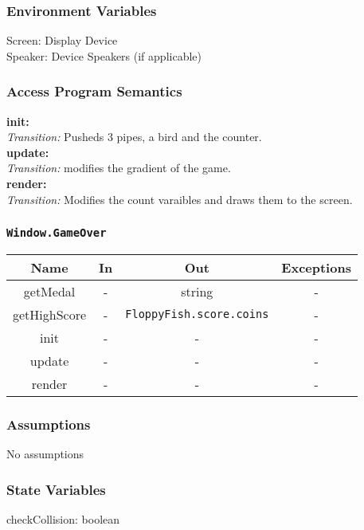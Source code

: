 \documentclass[11pt, oneside]{article}   	%
\begin{document}
\subsubsection*{Environment Variables}
Screen: Display Device\\
Speaker: Device Speakers (if applicable)\\

\subsubsection*{Access Program Semantics} 
 \textbf{init:}  \\
 \textit{Transition:} Pusheds 3 pipes, a bird and the counter.\\
 \textbf{update:}  \\
 \textit{Transition:} modifies the gradient of the game.\\
 \textbf{render:}  \\
 \textit{Transition:} Modifies the count varaibles and draws them to the screen.\\


\subsubsection*{\texttt{Window.GameOver}}



\begin{center}
\begin{tabular}{ |c|c|c|c| } 
 \hline
 Name & In & Out & Exceptions \\ 
 \hline \hline
 getMedal & - & string & - \\ 
 getHighScore & - & \texttt{FloppyFish.score.coins} & - \\ 
 init & - & - & - \\ 
 update & - & - & - \\ 
 render & - & - & - \\ 

 \hline
\end{tabular}
\end{center}

\subsubsection*{Assumptions}
No assumptions

\subsubsection*{State Variables}
checkCollision: boolean\\
\end{document}
